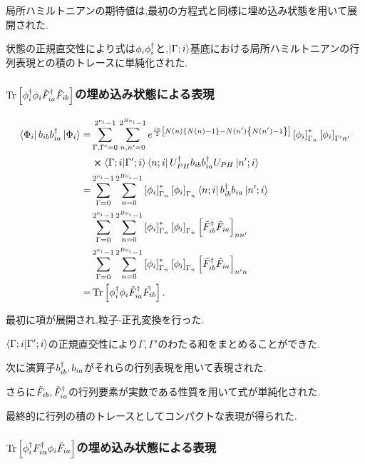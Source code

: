 局所ハミルトニアンの期待値は,最初の方程式と同様に埋め込み状態を用いて展開された.

状態の正規直交性により式は$\phi_{i}\phi^\dagger_{i}$と,$\Ket{\Gamma;i}$基底における局所ハミルトニアンの行列表現との積のトレースに単純化された.

\subsubsection{$\Tr \left[ \phi^\dagger_{i}\phi_{i}\tilde{F}^\dagger_{ia}\tilde{F}_{ib} \right]$の埋め込み状態による表現}

\begin{equation}
\begin{split}
    \Bra{\Phi_{i}}b_{ib}b^\dagger_{ia}\Ket{\Phi_{i}}=&\sum_{\Gamma,\Gamma'=0}^{2^{\nu_{i}}-1}\sum_{n,n'=0}^{2^{B\nu_{i}}-1}e^{\frac{i\pi}{2}\left[ N(n)\left \{ N(n)-1 \right\}-N(n')\left \{ N(n')-1 \right\} \right]}\left[ \phi_{i} \right]^*_{\Gamma_{n}}\left[ \phi_{i} \right]_{\Gamma'n'}\\
    &\cross \braket{\Gamma;i}{\Gamma';i}\Bra{n;i}U^\dagger_{PH}b_{ib}b^\dagger_{ia}U_{PH}\Ket{n';i}\\
    =&\sum_{\Gamma=0}^{2^{\nu_{i}}-1}\sum_{n=0}^{2^{B\nu_{i}}-1}\left[ \phi_{i} \right]^*_{\Gamma_{n}}\left[ \phi_{i} \right]_{\Gamma_{n}}\Bra{n;i}b^\dagger_{ib}b_{ia}\Ket{n';i}\\
    &\sum_{\Gamma=0}^{2^{\nu_{i}}-1}\sum_{n=0}^{2^{B\nu_{i}}-1}\left[ \phi_{i} \right]^*_{\Gamma_{n}}\left[ \phi_{i} \right]_{\Gamma_{n}}\left[ \tilde{F}^\dagger_{ib}\tilde{F}_{ia} \right]_{nn'}\\
    &\sum_{\Gamma=0}^{2^{\nu_{i}}-1}\sum_{n=0}^{2^{B\nu_{i}}-1}\left[ \phi_{i} \right]^*_{\Gamma_{n}}\left[ \phi_{i} \right]_{\Gamma_{n}}\left[ \tilde{F}^\dagger_{ib}\tilde{F}_{ia} \right]_{n'n}\\
    =&\Tr \left[ \phi^\dagger_{i}\phi_{i}\tilde{F}^\dagger_{ia}\tilde{F_{ib}} \right].
\end{split}
\end{equation}

最初に項が展開され,粒子-正孔変換を行った.

$\braket{\Gamma;i}{\Gamma';i}$の正規直交性により$\Gamma,\Gamma'$のわたる和をまとめることができた.

次に演算子$b^\dagger_{ib},b_{ia}$がそれらの行列表現を用いて表現された.

さらに$\tilde{F}_{ib},\tilde{F}^\dagger_{ia}$の行列要素が実数である性質を用いて式が単純化された.

最終的に行列の積のトレースとしてコンパクトな表現が得られた.

\subsubsection{$\Tr \left[ \phi ^\dagger_{i}F^\dagger_{i\alpha}\phi_{i}\tilde{F}_{ia} \right]$の埋め込み状態による表現}

